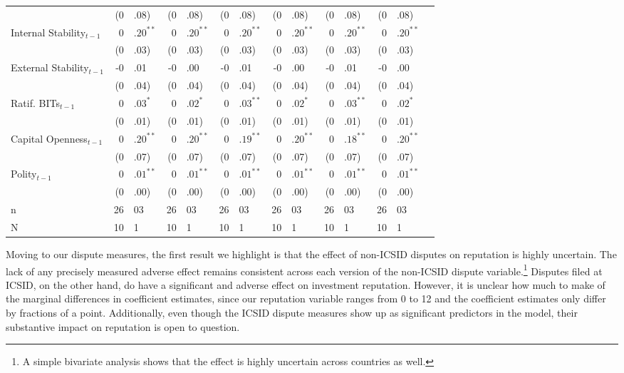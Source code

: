 \documentclass[12pt,onesided]{amsart}
\begin{document}
\begin{table}[ht]
{\begin{tabular}{lr@{} lr@{}lr@{}lr@{} lr@{}lr@{}lr@{} }
   & (0&.08) & (0&.08) & (0&.08) & (0&.08) & (0&.08) & (0&.08) \\ 
  Internal Stability$_{t-1}$ & $0$&$.20^{\ast\ast}$ & $0$&$.20^{\ast\ast}$ & $0$&$.20^{\ast\ast}$ & $0$&$.20^{\ast\ast}$ & $0$&$.20^{\ast\ast}$ & $0$&$.20^{\ast\ast}$ \\ 
   & (0&.03) & (0&.03) & (0&.03) & (0&.03) & (0&.03) & (0&.03) \\ 
  External Stability$_{t-1}$ & -0&.01 & -0&.00 & -0&.01 & -0&.00 & -0&.01 & -0&.00 \\ 
   & (0&.04) & (0&.04) & (0&.04) & (0&.04) & (0&.04) & (0&.04) \\ 
  Ratif. BITs$_{t-1}$ & $0$&$.03^{\ast}$ & $0$&$.02^{\ast}$ & $0$&$.03^{\ast\ast}$ & $0$&$.02^{\ast}$ & $0$&$.03^{\ast\ast}$ & $0$&$.02^{\ast}$ \\ 
   & (0&.01) & (0&.01) & (0&.01) & (0&.01) & (0&.01) & (0&.01) \\ 
  Capital Openness$_{t-1}$ & $0$&$.20^{\ast\ast}$ & $0$&$.20^{\ast\ast}$ & $0$&$.19^{\ast\ast}$ & $0$&$.20^{\ast\ast}$ & $0$&$.18^{\ast\ast}$ & $0$&$.20^{\ast\ast}$ \\ 
   & (0&.07) & (0&.07) & (0&.07) & (0&.07) & (0&.07) & (0&.07) \\ 
  Polity$_{t-1}$ & $0$&$.01^{\ast\ast}$ & $0$&$.01^{\ast\ast}$ & $0$&$.01^{\ast\ast}$ & $0$&$.01^{\ast\ast}$ & $0$&$.01^{\ast\ast}$ & $0$&$.01^{\ast\ast}$ \\ 
   & (0&.00) & (0&.00) & (0&.00) & (0&.00) & (0&.00) & (0&.00) \\ 
   \hline
n & 26&03 & 26&03 & 26&03 & 26&03 & 26&03 & 26&03 \\ 
  N & 10&1 & 10&1 & 10&1 & 10&1 & 10&1 & 10&1 \\ 
   \hline
\hline
\end{tabular}
}
\end{table}

Moving to our dispute measures, the first result we highlight is that the effect of non-ICSID disputes on reputation is highly uncertain. The lack of any precisely measured adverse effect remains consistent across each version of the non-ICSID dispute variable.\footnote{A simple bivariate analysis shows that the effect is highly uncertain across countries as well.} Disputes filed at ICSID, on the other hand, do have a significant and adverse effect on investment reputation. However, it is unclear how much to make of the marginal differences in coefficient estimates, since our reputation variable ranges from 0 to 12 and the coefficient estimates only differ by fractions of a point. Additionally, even though the ICSID dispute measures show up as significant predictors in the model, their substantive impact on reputation is open to question. 
\end{document}
